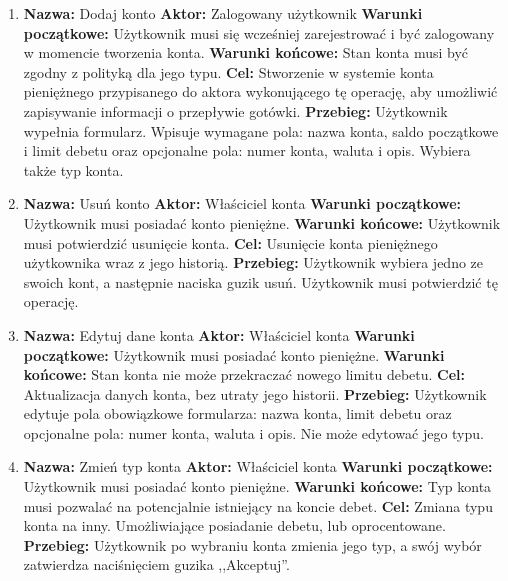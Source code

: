 \begin{enumerate}[labelwidth=1em,label=\arabic*.]
\item \textbf{Nazwa:} Dodaj konto \newline
    \textbf{Aktor:} Zalogowany użytkownik \newline
    \textbf{Warunki początkowe:} Użytkownik musi się wcześniej zarejestrować i być zalogowany w momencie tworzenia konta. \newline
    \textbf{Warunki końcowe:} Stan konta musi być zgodny z polityką dla jego typu. \newline
    \textbf{Cel:} Stworzenie w systemie konta pieniężnego przypisanego do aktora wykonującego tę operację, aby umożliwić zapisywanie informacji o przepływie gotówki. \newline
    \textbf{Przebieg:} Użytkownik wypełnia formularz. Wpisuje wymagane pola: nazwa konta, saldo początkowe i limit debetu oraz opcjonalne pola: numer konta, waluta i opis. Wybiera także typ konta.
\item \textbf{Nazwa:} Usuń konto \newline
    \textbf{Aktor:} Właściciel konta \newline
    \textbf{Warunki początkowe:} Użytkownik musi posiadać konto pieniężne. \newline
    \textbf{Warunki końcowe:} Użytkownik musi potwierdzić usunięcie konta. \newline
    \textbf{Cel:} Usunięcie konta pieniężnego użytkownika wraz z jego historią. \newline
    \textbf{Przebieg:} Użytkownik wybiera jedno ze swoich kont, a następnie naciska guzik usuń. Użytkownik musi potwierdzić tę operację.
\item \textbf{Nazwa:} Edytuj dane konta \newline
    \textbf{Aktor:} Właściciel konta \newline
    \textbf{Warunki początkowe:} Użytkownik musi posiadać konto pieniężne. \newline
    \textbf{Warunki końcowe:} Stan konta nie może przekraczać nowego limitu debetu. \newline
    \textbf{Cel:} Aktualizacja danych konta, bez utraty jego historii. \newline
    \textbf{Przebieg:} Użytkownik edytuje pola obowiązkowe formularza: nazwa konta, limit debetu oraz opcjonalne pola: numer konta, waluta i opis. Nie może edytować jego typu.
\item \label{last-item1}\textbf{Nazwa:} Zmień typ konta\newline
    \textbf{Aktor:} Właściciel konta \newline
    \textbf{Warunki początkowe:} Użytkownik musi posiadać konto pieniężne. \newline
    \textbf{Warunki końcowe:} Typ konta musi pozwalać na potencjalnie istniejący na koncie debet. \newline
    \textbf{Cel:} Zmiana typu konta na inny. Umożliwiające posiadanie debetu, lub oprocentowane. \newline
    \textbf{Przebieg:} Użytkownik po wybraniu konta zmienia jego typ, a swój wybór zatwierdza naciśnięciem guzika ,,Akceptuj''. 
\end{enumerate}

